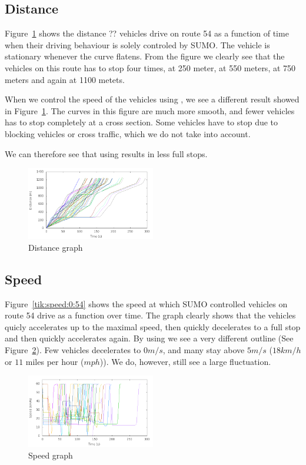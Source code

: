 \subsection{Distance}
Figure~\ref{fig:TestResults:distance100} shows the distance ?? vehicles drive on route 54 as a function of time when their driving behaviour is solely controled by SUMO. 
The vehicle is stationary whenever the curve flatens.
From the figure we clearly see that the vehicles on this route has to stop four times, at 250 meter, at 550 meters, at 750 meters and again at 1100 metets.

When we control the speed of the vehicles using \tech, we see a different result showed in Figure~\ref{fig:TestResults:distance100}.
The curves in this figure are much more smooth, and fewer vehicles has to stop completely at a cross section.
Some vehicles have to stop due to blocking vehicles or cross traffic, which we do not take into account.

We can therefore see that using \tech results in less full stops.


\begin{figure}[htb]
\includegraphics[width=0.5\textwidth]{images/tp0/distance100.png}
\caption{Distance graph}
\label{fig:TestResults:distance100}
\end{figure}

\subsection{Speed}
Figure~\ref{tik:speed:0:54} shows the speed at which SUMO controlled vehicles on route 54 drive as a function over time.
The graph clearly shows that the vehicles quicly accelerates up to the maximal speed, then quickly decelerates to a full stop and then quickly accelerates again.
By using \tech we see a very different outline (See Figure~\ref{fig:TestResults:speed100}).
Few vehicles decelerates to $0 m/s$, and many stay above $5 m/s$ ($18 km/h$ or $11$ miles per hour ($mph$)).
We do, however, still see a large fluctuation.
\begin{figure}[htb]
\includegraphics[width=0.5\textwidth]{images/tp0/speed100.png}
\caption{Speed graph}
\label{fig:TestResults:speed100}
\end{figure}




